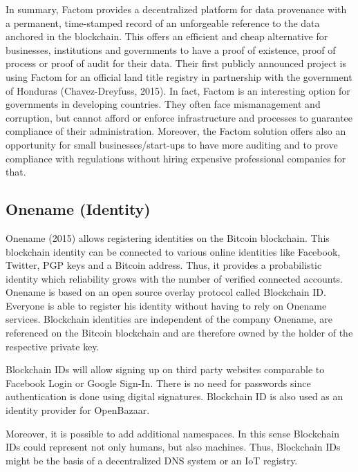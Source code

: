 In summary, Factom provides a decentralized platform for data provenance with a 
permanent, time-stamped record of an unforgeable reference to the data anchored 
in the blockchain. This offers an efficient and cheap alternative for businesses, 
institutions and governments to have a proof of existence, proof of process or 
proof of audit for their data. Their first publicly announced project is using 
Factom for an official land title registry in partnership with the government of 
Honduras (Chavez-Dreyfuss, 2015). In fact, Factom is an interesting option for 
governments in developing countries. They often face mismanagement and corruption, 
but cannot afford or enforce infrastructure and processes to guarantee compliance 
of their administration. Moreover, the Factom solution offers also an opportunity 
for small businesses/start-ups to have more auditing and to prove compliance with 
regulations without hiring expensive professional companies for that.

\subsection{Onename (Identity)}
\label{sec:ecoonename}

Onename (2015) allows registering identities on the Bitcoin blockchain. This blockchain 
identity can be connected to various online identities like Facebook, Twitter, 
PGP keys and a Bitcoin address. Thus, it provides a probabilistic identity which 
reliability grows with the number of verified connected accounts. Onename is based 
on an open source overlay protocol called Blockchain ID. Everyone is able to register 
his identity without having to rely on Onename services. Blockchain identities 
are independent of the company Onename, are referenced on the Bitcoin blockchain 
and are therefore owned by the holder of the respective private key.

Blockchain IDs will allow signing up on third party websites comparable to Facebook 
Login or Google Sign-In. There is no need for passwords since authentication is 
done using digital signatures. Blockchain ID is also used as an identity provider 
for OpenBazaar. 

Moreover, it is possible to add additional namespaces. In this sense Blockchain 
IDs could represent not only humans, but also machines. Thus, Blockchain IDs might 
be the basis of a decentralized DNS system or an IoT registry. 

